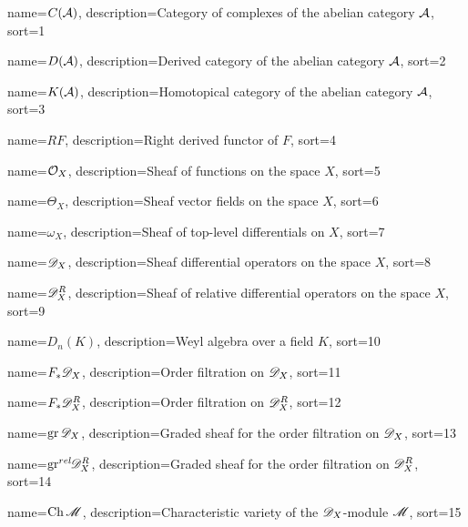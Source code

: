 

{
  name={\ensuremath{C(\AA)}},
  description={Category of complexes of the abelian category $\AA$},
  sort=1
}


{
  name={\ensuremath{D(\AA)}},
  description={Derived category of the abelian category $\AA$},
  sort=2
}

{
  name={\ensuremath{K(\AA)}},
  description={Homotopical category of the abelian category $\AA$},
  sort=3
}


{
  name={\ensuremath{RF}},
  description={Right derived functor of $F$},
  sort=4
}


{
  name={\ensuremath{\O_X}},
  description={Sheaf of functions on the space $X$},
  sort=5
}


{
  name={\ensuremath{\Theta_X}},
  description={Sheaf vector fields on the space $X$},
  sort=6
}

{
  name={\ensuremath{\omega_X}},
  description={Sheaf of top-level differentials on $X$},
  sort=7
}


{
  name={\ensuremath{\D_X}},
  description={Sheaf differential operators on the space $X$},
  sort=8
}


{
  name={\ensuremath{\D_X^R}},
  description={Sheaf of relative differential operators on the space $X$},
  sort=9
}


{
  name={\ensuremath{D_n(K)}},
  description={Weyl algebra over a field $K$},
  sort=10
}


{
  name={\ensuremath{F_*\D_X}},
  description={Order filtration on $\D_X$},
  sort=11
}


{
  name={\ensuremath{F_*\D_X^R}},
  description={Order filtration on $\D_X^R$},
  sort=12
}



{
  name={\ensuremath{\gr \D_X}},
  description={Graded sheaf for the order filtration on $\D_X$},
  sort=13
}



{
  name={\ensuremath{\grrel \D_X^R}},
  description={Graded sheaf for the order filtration on $\D_X^R$},
  sort=14
}

{
  name={\ensuremath{\Ch \M}},
  description={Characteristic variety of the $\D_X$-module $\M$},
  sort=15
}


